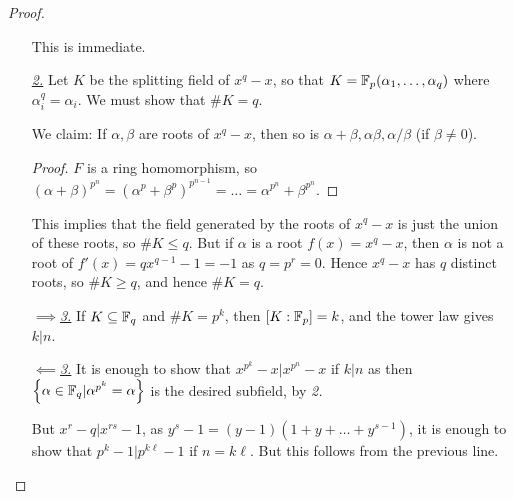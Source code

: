 \documentclass[a4paper, 10pt, twocolumn]{amsart}
\begin{document}
\begin{proof}
\item
\begin{itemize}
\item[\imp{2}{1}] This is immediate.
\item[\underline{\textit{2.}}] Let $K$ be the splitting field of $x^q-x$, so that $K = \mathbb{F}_p(\alpha_1, \ldots, \alpha_q)$ where $\alpha_i^q = \alpha_i$. We must show that $\#K = q$.

We claim: If $\alpha, \beta$ are roots of $x^q - x$, then so is $\alpha+\beta, \alpha\beta, \alpha/\beta$ (if $\beta\neq 0$).
\begin{proof}
$F$ is a ring homomorphism, so $(\alpha+\beta)^{p^n} = (\alpha^p + \beta^p)^{p^{n-1}} = \ldots = \alpha^{p^n} + \beta^{p^n}$.
\end{proof}
This implies that the field generated by the roots of $x^q-x$ is just the union of these roots, so $\#K \leq q$. But if $\alpha$ is a root $f(x) = x^q-x$, then $\alpha$ is not a root of $f'(x) = qx^{q-1} - 1 = -1$ as $q = p^r = 0$. Hence $x^q-x$ has $q$ distinct roots, so $\#K \geq q$, and hence $\#K = q$.
\item[\underline{$\implies$\textit{3.}}] If $K\subseteq \mathbb{F}_q$ and $\#K=p^k$, then $[K:\mathbb{F}_p] = k$, and the tower law gives $k|n$.
\item[\underline{$\impliedby$\textit{3.}}] It is enough to show that $x^{p^k}-x | x^{p^n}-x$ if $k|n$ as then $\left\{\alpha\in\mathbb{F}_q | \alpha^{p^k} = \alpha\right\}$ is the desired subfield, by \textit{2.}

But $x^r-q | x^{rs} - 1$, as $y^s - 1 = (y-1)(1+ y + \ldots + y^{s-1})$, it is enough to show that $p^k-1 | p^{k\ell}-1$ if $n=k\ell$. But this follows from the previous line.
\end{itemize}
\end{proof}
\end{document}
